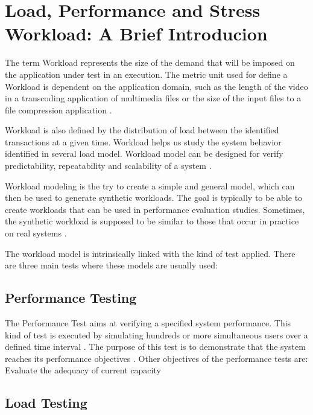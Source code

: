 \section{Load, Performance and Stress Workload: A Brief Introducion}

The term Workload represents  the size of the demand that will be imposed on the application under test in an execution. The metric unit used for define a Workload is dependent on the application domain, such as the length of the video in a transcoding application of multimedia files or the size of the input files to a file compression application \cite{Feitelson2013} \cite{Molyneaux2009} \cite{Goncalves2014}. 

Workload is also defined by the distribution of load between the identified transactions at a given time. Workload helps us study the system behavior identified in several load model. Workload model can be designed for verify predictability, repeatability and scalability of a system \cite{Feitelson2013} \cite{Molyneaux2009}.


Workload modeling is the try to create a simple and general model, which can
then be used to generate synthetic workloads. The goal is typically to be able to create workloads that can
be used in performance evaluation studies. Sometimes, the synthetic workload is supposed to be
similar to those that occur in practice on real systems \cite{Feitelson2013} \cite{Molyneaux2009}.


The workload model is intrinsically linked with the kind of test applied. There are three main tests where these models are usually used: 


\subsection{Performance Testing}

The Performance Test aims at verifying a specified system performance. This kind of test is executed by simulating hundreds or more simultaneous users  over a defined time interval \cite{DiLucca2006}. The purpose of this test is to demonstrate that the system  reaches its performance objectives \cite{Sandler2004}. Other objectives of the performance tests are: Evaluate the adequacy of current capacity	



\subsection{Load Testing}

